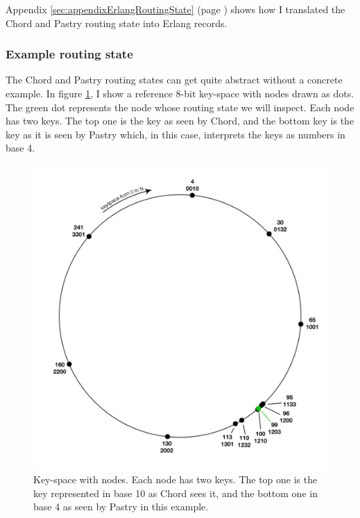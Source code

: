 \mbox{}

Appendix \ref{sec:appendixErlangRoutingState} (page \pageref{sec:appendixErlangRoutingState}) shows how I translated the Chord and Pastry routing state into Erlang records.

\subsubsection{Example routing state}
The Chord and Pastry routing states can get quite abstract without a concrete example.
In figure \ref{figKeyspaceExample}, I show a reference 8-bit key-space with nodes drawn as dots. The green dot represents the node whose routing state we will inspect. Each node has two keys. The top one is the key as seen by Chord, and the bottom key is the key as it is seen by Pastry which, in this case, interprets the keys as numbers in base 4.

\begin{figure}[!htb]
\begin{center}
	\includegraphics[width=0.9\linewidth]{illustrations/KeyspaceExample.png}
  \caption{Key-space with nodes. Each node has two keys. The top one is the key represented in base 10 as Chord sees it, and the bottom one in base 4 as seen by Pastry in this example.}
  \label{figKeyspaceExample}
\end{center}
\end{figure}

